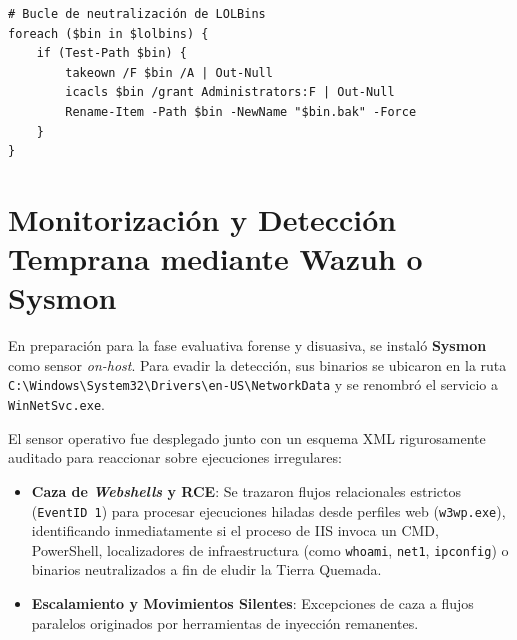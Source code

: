 \begin{lstlisting}
# Bucle de neutralización de LOLBins
foreach ($bin in $lolbins) {
    if (Test-Path $bin) {
        takeown /F $bin /A | Out-Null
        icacls $bin /grant Administrators:F | Out-Null
        Rename-Item -Path $bin -NewName "$bin.bak" -Force
    }
}
\end{lstlisting}

\section[Monitorización mediante Wazuh/Sysmon]{Monitorización y Detección Temprana mediante Wazuh o Sysmon}
\label{sec:monitorizacion_deteccion}
En preparación para la fase evaluativa forense y disuasiva, se instaló \textbf{Sysmon} como sensor \textit{on-host}. Para evadir la detección, sus binarios se ubicaron en la ruta \newline\texttt{C:\textbackslash Windows\textbackslash System32\textbackslash Drivers\textbackslash en-US\textbackslash NetworkData} \newline y se renombró el servicio a \texttt{WinNetSvc.exe}.

El sensor operativo fue desplegado junto con un esquema XML rigurosamente auditado para reaccionar sobre ejecuciones irregulares:
\begin{itemize}
    \item \textbf{Caza de \textit{Webshells} y RCE}: Se trazaron flujos relacionales estrictos (\texttt{EventID 1}) para procesar ejecuciones hiladas desde perfiles web (\texttt{w3wp.exe}), identificando inmediatamente si el proceso de IIS invoca un CMD, PowerShell, localizadores de infraestructura (como \texttt{whoami}, \texttt{net1}, \texttt{ipconfig}) o binarios neutralizados a fin de eludir la Tierra Quemada.
    \item \textbf{Escalamiento y Movimientos Silentes}: Excepciones de caza a flujos paralelos originados por herramientas de inyección remanentes.
\end{itemize}
